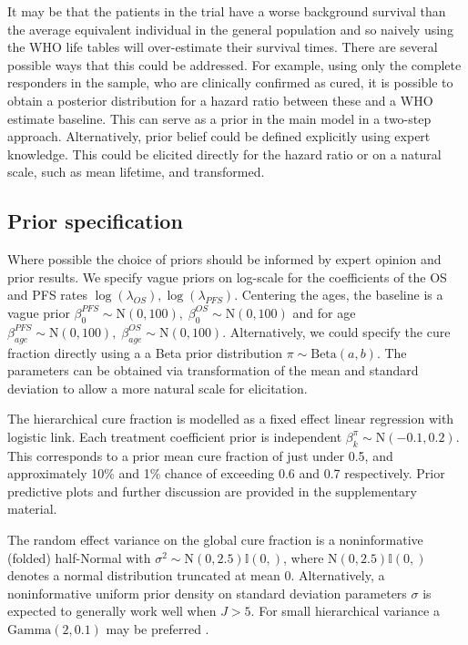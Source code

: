 \documentclass[AMA,STIX1COL]{WileyNJD-v2}
\begin{document}
It may be that the patients in the trial have a worse background survival than the average equivalent individual in the general population and so naively using the WHO life tables will over-estimate their survival times.
There are several possible ways that this could be addressed.
For example, using only the complete responders in the sample, who are clinically confirmed as cured, it is possible to obtain a posterior distribution for a hazard ratio between these and a WHO estimate baseline.
This can serve as a prior in the main model in a two-step approach. Alternatively, prior belief could be defined explicitly using expert knowledge.
This could be elicited directly for the hazard ratio or on a natural scale, such as mean lifetime, and transformed.

%
\subsection{Prior specification}
Where possible the choice of priors should be informed by expert opinion and prior results.
We specify vague priors on log-scale for the coefficients of the OS and PFS rates $\log(\lambda_{OS}),  \log(\lambda_{PFS})$.
Centering the ages, the baseline is a vague prior ${\beta_0^{PFS} \sim \text{N}(0, 100),}\; {\beta_0^{OS} \sim \text{N}(0, 100)}$
and for age $\beta_{age}^{PFS} \sim \text{N}(0, 100),\; \beta_{age}^{OS} \sim \text{N}(0, 100)$.
Alternatively, we could specify the cure fraction directly using a a Beta prior distribution $\pi \sim \text{Beta}(a, b)$.
The parameters can be obtained via transformation of the mean and standard deviation to allow a more natural scale for elicitation.

The hierarchical cure fraction is modelled as a fixed effect linear regression with logistic link. Each treatment coefficient prior is independent $\beta^{\pi}_k \sim \text{N}(-0.1, 0.2)$.
This corresponds to a prior mean cure fraction of just under 0.5, and approximately 10\% and 1\% chance of exceeding 0.6 and 0.7 respectively.
Prior predictive plots and further discussion are provided in the supplementary material.

The random effect variance on the global cure fraction is a noninformative (folded) half-Normal \cite{Gelman2006} with 
${\sigma^2 \sim \text{N}(0, 2.5)\mathbb{I}(0,)}$, where $\text{N}(0, 2.5)\mathbb{I}(0,)$ denotes a normal distribution truncated at mean 0.
Alternatively, a noninformative uniform prior density on standard deviation parameters $\sigma$ is expected to generally work well when $J > 5$.
For small hierarchical variance a $\text{Gamma}(2, 0.1)$ may be preferred \cite{Chung2013}.
\end{document}
